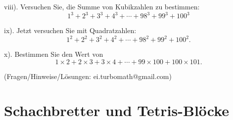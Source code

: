 viii). Versuchen Sie, die Summe von Kubikzahlen zu bestimmen: $$1^3+2^3+3^3+4^3+\cdots +98^3+99^3+100^3$$


ix). Jetzt versuchen Sie mit Quadratzahlen: $$1^2+2^2+3^2+4^2+\cdots +98^2+99^2+100^2.$$


x). Bestimmen Sie den Wert von $$1\times2+2\times3+3\times4+\cdots +99\times100+100\times101.$$



\vspace{1cm}
(Fragen/Hinweise/Lösungen: ei.turbomath@gmail.com)

\newpage

\section*{Schachbretter und Tetris-Blöcke}

